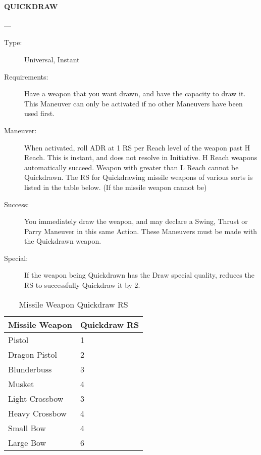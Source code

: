 \documentclass[oneside,11pt,english]{book}
\begin{document}
\paragraph{\large\label{man:QUICKDRAW} QUICKDRAW}---\quad{\large[1]}
\vspace{-10pt}\begin{description} 
\item [Type:] Universal, Instant 
\item [Requirements:] Have a weapon that you want drawn, and have the capacity to draw it. This Maneuver can only be activated if no other Maneuvers have been used first.
\item [Maneuver:] When activated, roll ADR at 1 RS per Reach level of the weapon past H Reach. This is instant, and does not resolve in Initiative. H Reach weapons automatically succeed. Weapon with greater than L Reach cannot be Quickdrawn.
The RS for Quickdrawing missile weapons of various sorts is listed in the table below. (If the missile weapon cannot be)
\item [Success:] You immediately draw the weapon, and may declare a Swing, Thrust or Parry Maneuver in this same Action. These Maneuvers must be made with the Quickdrawn weapon. 
\item [Special:] If the weapon being Quickdrawn has the Draw special quality, reduces the RS to successfully Quickdraw it by 2. 
\end{description}
\begin{table}[!ht]
	\centering
	\caption{Missile Weapon Quickdraw RS}
	\label{tab:Quickdraw RS Missile Weapons}
	\begin{tabu} spread 0pt{XX}
Missile Weapon &Quickdraw RS \\\toprule
Pistol &1 \\
Dragon Pistol& 2 \\
Blunderbuss &3 \\
Musket &4 \\
Light Crossbow &3 \\
Heavy Crossbow &4 \\
Small Bow &4 \\
Large Bow &6 \\
\end{tabu}
\end{table}
\end{document}
